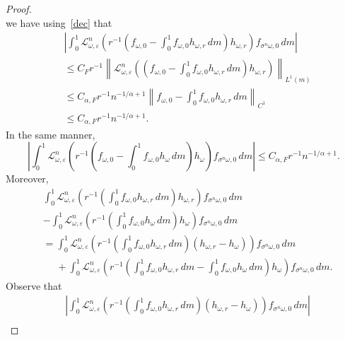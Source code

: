 \documentclass[10pt,a4paper]{amsart}
\begin{document}
\begin{proof}
\[	\]
	we have using~\eqref{dec} that 
	\begin{equation}\label{gh2}
		\begin{split}
			&\left | \int_0^1 \mathcal L_{\omega, \varepsilon}^n \left (r^{-1}\left (f_{\omega, 0}-\int_0^1f_{\omega, 0}h_{\omega, r}\, dm\right )h_{\omega, r}\right )f_{\sigma^n \omega, 0}\, dm\right | \\
			&\le C_F r^{-1} \left \|\mathcal L_{\omega, \varepsilon}^n \left (\left (f_{\omega, 0}-\int_0^1f_{\omega, 0}h_{\omega, r}\, dm\right )h_{\omega, r} \right )\right \|_{L^1(m)} \\
			&\le C_{\alpha, F} r^{-1}n^{-1/\alpha+1} \left \|f_{\omega, 0}-\int_0^1f_{\omega, 0}h_{\omega, r}\, dm \right \|_{C^1} \\
			&\le C_{\alpha, F} r^{-1}n^{-1/\alpha+1}.
		\end{split}
	\end{equation}
	In the same manner, 
	\begin{equation}\label{gh3}
		\left |\int_0^1 \mathcal L_{\omega, \varepsilon}^n \left(r^{-1} \left (f_{\omega, 0}-\int_0^1 f_{\omega, 0}h_\omega\, dm\right )h_\omega \right )f_{\sigma^n \omega, 0}\, dm\right |\le C_{\alpha, F} r^{-1}n^{-1/\alpha+1}.
	\end{equation}
	Moreover, 
	\[
	\begin{split}
		&\int_0^1 \mathcal L_{\omega, \varepsilon}^n \left (r^{-1}\left (\int_0^1 f_{\omega, 0}h_{\omega, r}\, dm\right )h_{\omega, r}\right )f_{\sigma^n \omega, 0}\, dm\\
		&-\int_0^1 \mathcal L_{\omega, \varepsilon}^n \left (r^{-1} \left (\int_0^1 f_{\omega, 0}h_\omega\, dm\right )h_\omega \right )f_{\sigma^n \omega, 0}\, dm \\
		&=\int_0^1 \mathcal L_{\omega, \varepsilon}^n \left (r^{-1} \left(\int_0^1f_{\omega, 0}h_{\omega, r}\, dm\right ) (h_{\omega, r}-h_{\omega}) \right )f_{\sigma^n \omega, 0}\, dm \\
		&\phantom{=}+\int_0^1 \mathcal L_{\omega, \varepsilon}^n \left (r^{-1}\left (\int_0^1 f_{\omega, 0}h_{\omega, r}\, dm-\int_0^1f_{\omega, 0}h_\omega \, dm\right )h_\omega \right )f_{\sigma^n \omega, 0}\, dm.
	\end{split}
	\]
	Observe that 
	\begin{equation}\label{gh4}
		\begin{split}
			& \left |\int_0^1 \mathcal L_{\omega, \varepsilon}^n \left (r^{-1} \left (\int_0^1f_{\omega, 0}h_{\omega, r}\, dm\right ) (h_{\omega, r}-h_{\omega}) \right )f_{\sigma^n \omega, 0}\, dm \right |\\

\end{split}
\end{equation}
\end{proof}
\end{document}
